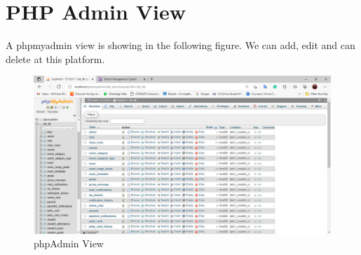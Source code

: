 \section{PHP Admin View}
A phpmyadmin view is showing in the following figure. We can add, edit and can delete at this platform.
\begin{figure}[H]  %
\begin{center}
\includegraphics[scale=0.42]{Chapter4/phpadmin}
\caption{phpAdmin View}
\label{parent}
\end{center}
\end{figure}